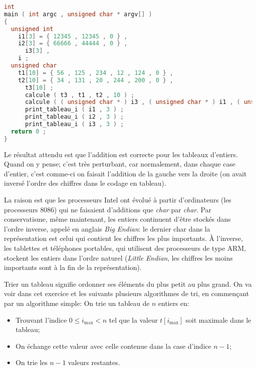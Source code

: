 \begin{solution}
\begin{lstlisting}[language=C]
int
main ( int argc , unsigned char * argv[] )
{
  unsigned int
    i1[3] = { 12345 , 12345 , 0 } ,
    i2[3] = { 66666 , 44444 , 0 } ,
      i3[3] ,
	i ;
  unsigned char
    t1[10] = { 56 , 125 , 234 , 12 , 124 , 0 } ,
    t2[10] = { 34 , 131 , 20 , 244 , 200 , 0 } ,
      t3[10] ;
      calcule ( t3 , t1 , t2 , 10 ) ;
      calcule ( ( unsigned char * ) i3 , ( unsigned char * ) i1 , ( unsigned char * ) i2 , 3 * sizeof ( int ) ) ;
      print_tableau_i ( i1 , 3 ) ;
      print_tableau_i ( i2 , 3 ) ;
      print_tableau_i ( i3 , 3 ) ;
  return 0 ;
}    
  \end{lstlisting}
  Le résultat attendu est que l'addition est correcte pour les
  tableaux d'entiers. Quand on y pense; c'est très perturbant, car
  normalement, dans chaque case d'entier, c'est comme-ci on faisait
  l'addition de la gauche vers la droite (on avait inversé l'ordre des
  chiffres dans le codage en tableau).

  La raison est que les processeurs Intel ont évolué à partir
  d'ordinateurs (les processeurs 8086) qui ne faisaient d'additions
  que \emph{char} par \emph{char}. Par conservatisme, même maintenant,
  les entiers continuent d'être stockés dans l'ordre inverse, appelé
  en anglais \emph{Big Endian}: le dernier char dans la représentation
  est celui qui contient les chiffres les plus importants. À
  l'inverse, les tablettes et téléphones portables, qui utilisent des
  processeurs de type ARM, stockent les entiers dans l'ordre naturel
  (\emph{Little Endian}, les chiffres les moins importants sont à la
  fin de la représentation). 
\end{solution}


Trier un tableau signifie ordonner ses éléments du plus petit au plus
grand. On va voir dans cet exercice et les suivants plusieurs algorithmes de
tri, en commençant par un algorithme simple:
On trie un tableau de \(n\) entiers en:
\begin{itemize}
\item Trouvant l'indice \(0\le i_{\text{max}}<n\) tel que la valeur
  \(t[i_{\text{max}}]\) soit maximale dans le tableau;
\item On échange cette valeur avec celle contenue dans la case d'indice \(n-1\);
\item On trie les \(n-1\) valeurs restantes.
\end{itemize}

